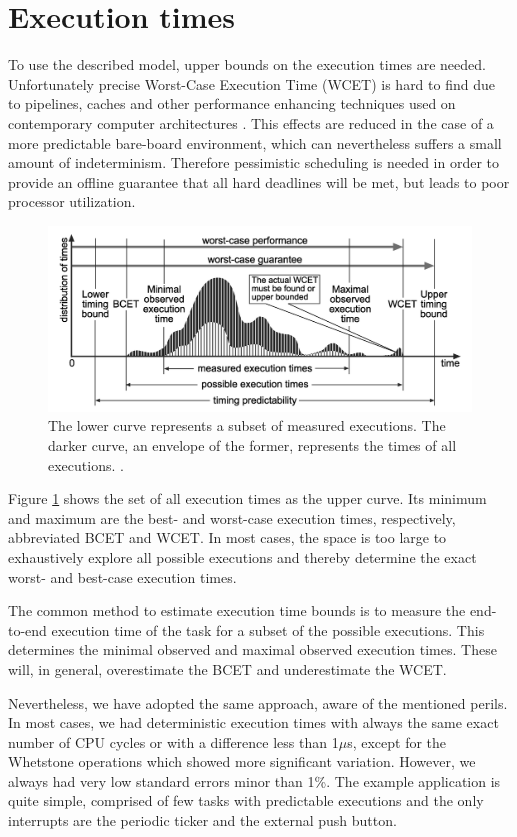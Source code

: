 \documentclass{article}
\begin{document}
\section{Execution times}

To use the described model, upper bounds on the execution times are needed. Unfortunately precise Worst-Case Execution Time (WCET) is hard to find due to pipelines, caches and other performance enhancing techniques used on contemporary computer architectures \cite{wcet-problem}. This effects are reduced in the case of a more predictable bare-board environment, which can nevertheless suffers a small amount of indeterminism. Therefore pessimistic scheduling is needed in order to provide an offline guarantee that all hard deadlines will be met, but leads to poor processor utilization.

\begin{figure}[!htbp]
\centering
\includegraphics[width=5in]{images/wcet}
\caption{The lower curve represents a subset of measured executions. The darker curve, an envelope of the former, represents the times of all executions. \cite{wcet-problem}.}
\label{wcet-curve}
\end{figure}

Figure \ref{wcet-curve} shows the set of all execution times as the upper curve. Its minimum and maximum are the best- and worst-case execution times, respectively, abbreviated BCET and WCET. In most cases, the space is too large to exhaustively explore all possible executions and thereby determine the exact worst- and best-case execution times.

The common method to estimate execution time bounds is to measure the end-to-end execution time of the task for a subset of the possible executions. This determines the minimal observed and maximal observed execution times. These will, in general, overestimate the BCET and underestimate the WCET.

Nevertheless, we have adopted the same approach, aware of the mentioned perils. In most cases, we had deterministic execution times with always the same exact number of CPU cycles or with a difference less than 1$\mu$s, except for the Whetstone operations which showed more significant variation. However, we always had very low standard errors minor than 1\%. The example application is quite simple, comprised of few tasks with predictable executions and the only interrupts are the periodic ticker and the external push button.
\end{document}
